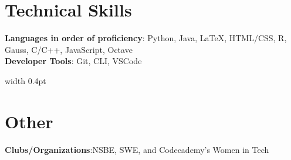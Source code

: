\documentclass[letterpaper,11.000000001 pt]{article}
\begin{document}
\begin{minipage}[t]{0.47\textwidth}
\vspace{0pt}
\section{Technical Skills}
 \begin{itemize}[leftmargin=0.15in, label={}]
    \small{\item{
     \textbf{Languages in order of proficiency}{: Python, Java, LaTeX, \newline HTML/CSS, R, Gauss, C/C++, JavaScript, Octave} \\
     \textbf{Developer Tools}{: Git, CLI, VSCode} \\
    }}
 \end{itemize}
\end{minipage}
\hspace{0.02\textwidth}
\vrule width 0.4pt
\hspace{0.02\textwidth}
\begin{minipage}[t]{0.47\textwidth}
\vspace{0pt}
\section{Other}
 \begin{itemize}[leftmargin=0.15in, label={}]
    \small{\item{
    \textbf{Clubs/Organizations}{:NSBE, SWE, and \newline Codecademy's Women in Tech} \\
    }}
 \end{itemize}
\end{minipage}
\end{document}
